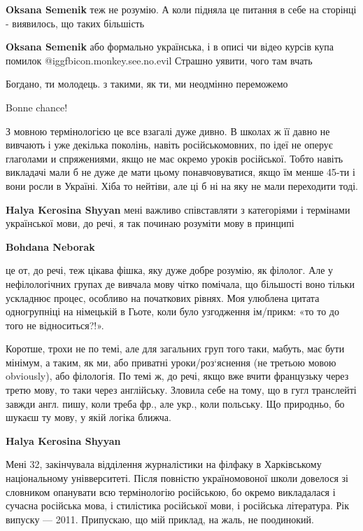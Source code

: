 \begin{itemize}
\begin{itemize} %
\textbf{Oksana Semenik} теж не розумію. А коли підняла це питання в себе на сторінці - виявилось, що таких більшість

\textbf{Oksana Semenik} або формально українська, і в описі чи відео курсів купа помилок  @igg{fbicon.monkey.see.no.evil}  Страшно уявити, чого там вчать
\end{itemize} %

Богдано, ти молодець. з такими, як ти, ми неодмінно переможемо

Bonne chance!


З мовною термінологією це все взагалі дуже дивно. В школах ж її давно не
вивчають і уже декілька поколінь, навіть російськомовних, по ідеї не оперує
глаголами и спряжениями, якщо не має окремо уроків російської. Тобто навіть
викладачі мали б не дуже де мати цьому понавчовуватися, якщо їм менше 45-ти і
вони росли в Україні. Хіба то нейтіви, але ці б ні на яку не мали переходити
тоді.

\begin{itemize} %
\textbf{Halya Kerosina Shyyan} мені важливо співставляти з категоріями і термінами української мови, до речі, я так починаю розуміти мову в принципі

\textbf{Bohdana Neborak} 

це от, до речі, теж цікава фішка, яку дуже добре розумію, як філолог. Але у
нефілологічних групах де вивчала мову чітко помічала, що більшості воно тільки
ускладнює процес, особливо на початкових рівнях. Моя улюблена цитата
одногрупніці на німецькій в Гьоте, коли було узгодження ім/прикм: «то то до
того не відноситься?!».

Коротше, трохи не по темі, але для загальних груп того таки, мабуть, має бути
мінімум, а таким, як ми, або приватні уроки/роз‘яснення (не третьою мовою
obviously), або філологія. По темі ж, до речі, якщо вже вчити французьку через
третю мову, то таки через англійську. Зловила себе на тому, що в гугл
транслейті завжди англ. пишу, коли треба фр., але укр., коли польську. Що
природньо, бо шукаєш ту мову, у якій логіка ближча.

\textbf{Halya Kerosina Shyyan} 

Мені 32, закінчувала відділення журналістики на філфаку в Харківському
національному унівверситеті. Після повністю україномовоної школи довелося зі
словником опанувати всю термінологію російською, бо окремо викладалася і
сучасна російська мова, і стилістика російської мови, і російська література.
Рік випуску — 2011. Припускаю, що мій приклад, на жаль, не поодинокий.


\end{itemize}
\end{itemize}
